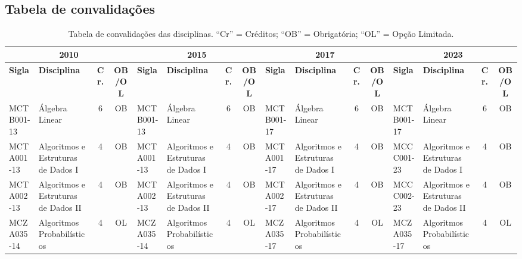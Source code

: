 \documentclass[a4paper]{article}
\begin{document}
\subsection{Tabela de convalidações}
\label{subsec:convalidacoes}

\begin{landscape}
{\footnotesize
\begin{longtable}{|l|p{.15\textheight}|c|c||l|p{.15\textheight}|c|c||l|p{.15\textheight}|c|c||l|p{.15\textheight}|c|c|}
    \caption{Tabela de convalidações das disciplinas. ``Cr'' = Créditos; ``OB'' = Obrigatória; ``OL'' = Opção Limitada.}
    \label{tab:convalidacoes_obrigatorias} \\

    \hline
    \multicolumn{4}{|c||}{\bf 2010} &
    \multicolumn{4}{|c|}{\bf 2015} &
    \multicolumn{4}{|c||}{\bf 2017} &
    \multicolumn{4}{|c|}{\bf 2023} \\ 
    \hline
    
    \textbf{Sigla} & \textbf{Disciplina} & \textbf{Cr.} & \textbf{OB/OL} &
    \textbf{Sigla} & \textbf{Disciplina} & \textbf{Cr.} & \textbf{OB/OL} &
    \textbf{Sigla} & \textbf{Disciplina} & \textbf{Cr.} & \textbf{OB/OL} &
    \textbf{Sigla} & \textbf{Disciplina} & \textbf{Cr.} & \textbf{OB/OL} \\
    \hline\hline
    
    MCTB001-13 & Álgebra Linear & 6 & OB &
    MCTB001-13 & Álgebra Linear & 6 & OB &
    MCTB001-17 & Álgebra Linear & 6 & OB &
    MCTB001-17 & Álgebra Linear & 6 & OB \\ \hline

    MCTA001-13 & Algoritmos e Estruturas de Dados I & 4 & OB &
    MCTA001-13 & Algoritmos e Estruturas de Dados I & 4 & OB &
    MCTA001-17 & Algoritmos e Estruturas de Dados I & 4 & OB &
    MCCC001-23 & Algoritmos e Estruturas de Dados I & 4 & OB  \\ \hline

    MCTA002-13 & Algoritmos e Estruturas de Dados II & 4 & OB &
    MCTA002-13 & Algoritmos e Estruturas de Dados II & 4 & OB & 
    MCTA002-17 & Algoritmos e Estruturas de Dados II & 4 & OB & 
    MCCC002-23 & Algoritmos e Estruturas de Dados II & 4 & OB  \\ \hline

    MCZA035-14 & Algoritmos Probabilísticos & 4 & OL &
    MCZA035-14 & Algoritmos Probabilísticos & 4 & OL &
    MCZA035-17 & Algoritmos Probabilísticos & 4 & OL &
    MCZA035-17 & Algoritmos Probabilísticos & 4 & OL \\ \hline


\end{longtable}}
\end{landscape}
\end{document}
